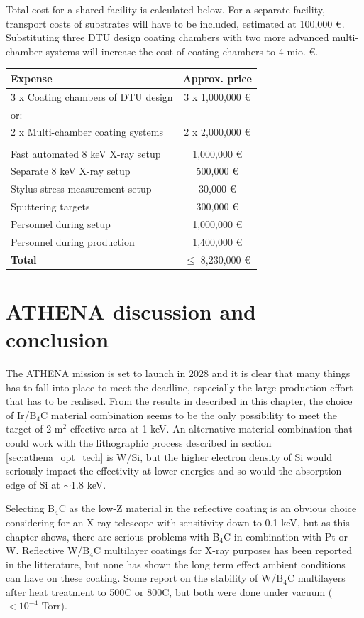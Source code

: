 Total cost for a shared facility is calculated below. For a separate facility, transport costs of substrates will have to be included, estimated at 100,000 \euro. Substituting three DTU design coating chambers with two more advanced multi-chamber systems will increase the cost of coating chambers to 4 mio. \euro.

\begin{table}[htbp]
	\centering
\begin{tabular}{l|c}
Expense & Approx. price\\
\hline
\hline
3 x Coating chambers of DTU design  & 3 x 1,000,000 \euro\\
\hline
or:\\
\hline
2 x Multi-chamber coating systems & 2 x 2,000,000 \euro \\
\hline
\\
\hline
Fast automated 8 keV X-ray setup  & 1,000,000 \euro\\
\hline
Separate 8 keV X-ray setup & 500,000 \euro\\
\hline
Stylus stress measurement setup & 30,000 \euro\\
\hline
Sputtering targets & 300,000 \euro\\
\hline
Personnel during setup & 1,000,000 \euro\\
\hline
Personnel during production & 1,400,000 \euro\\
\hline
\textbf{Total} & $\leq$ 8,230,000 \euro\\
\end{tabular}
\end{table}

\section{ATHENA discussion and conclusion}
The ATHENA mission is set to launch in 2028 and it is clear that many things has to fall into place to meet the deadline, especially the large production effort that has to be realised. From the results in described in this chapter, the choice of Ir/B$_4$C material combination seems to be the only possibility to meet the target of 2 m$^2$ effective area at 1 keV. An alternative material combination that could work with the lithographic process described in section \ref{sec:athena_opt_tech} is W/Si, but the higher electron density of Si would seriously impact the effectivity at lower energies and so would the absorption edge of Si at $\sim$1.8 keV.

Selecting B$_4$C as the low-Z material in the reflective coating is an obvious choice considering for an X-ray telescope with sensitivity down to 0.1 keV, but as this chapter shows, there are serious problems with B$_4$C in combination with Pt or W. Reflective W/B$_4$C multilayer coatings for X-ray purposes has been reported in the litterature\cite{Jankowski:1991kx,Morawe:2007vp}, but none has shown the long term effect ambient conditions can have on these coating. Some report on the stability of W/B$_4$C multilayers after heat treatment to 500\degr C\cite{JANKOWSKI:1990vd} or 800\degr C\cite{Rao:2013dt}, but both were done under vacuum ($<10^{-4}$ Torr).

